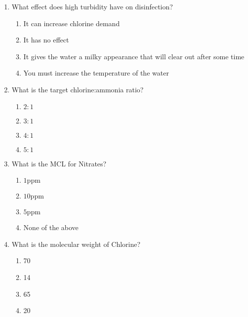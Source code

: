\documentclass{article}
\begin{document}
\begin{enumerate}
\item  What effect does high turbidity have on disinfection?\\
\begin{enumerate}
\item It can increase chlorine demand\\
\item It has no effect\\
\item It gives the water a milky appearance that will clear out after some time\\
\item You must increase the temperature of the water
\end{enumerate}

  \item What is the target chlorine:ammonia ratio?\\
\begin{enumerate}
\item $2: 1$\\
\item $3: 1$\\
\item $4: 1$\\
\item $5: 1$
\end{enumerate}

\item  What is the MCL for Nitrates?\\
\begin{enumerate}
\item $1 \mathrm{ppm}$\\
\item $10 \mathrm{ppm}$\\
\item $5 \mathrm{ppm}$\\
\item None of the above
\end{enumerate}

\item  What is the molecular weight of Chlorine?\\
\begin{enumerate}
\item 70\\
\item 14\\
\item 65\\
\item 20
\end{enumerate}


\end{enumerate}
\end{document}
